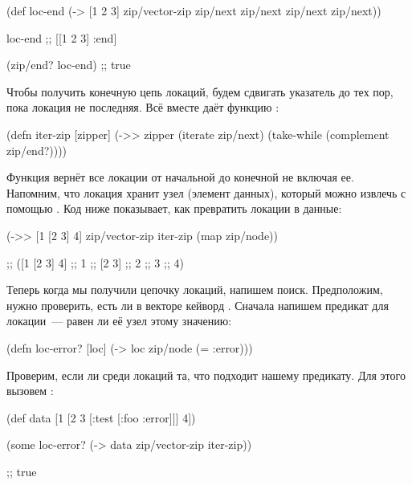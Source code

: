 \begin{english}
  \begin{clojure}
(def loc-end
  (-> [1 2 3]
      zip/vector-zip
      zip/next
      zip/next
      zip/next
      zip/next))

loc-end
;; [[1 2 3] :end]

(zip/end? loc-end)
;; true

  \end{clojure}
\end{english}

Чтобы получить конечную цепь локаций, будем сдвигать указатель до тех пор, пока
локация не последняя. Всё вместе даёт функцию :

\begin{english}
  \begin{clojure}
(defn iter-zip [zipper]
  (->> zipper
       (iterate zip/next)
       (take-while (complement zip/end?))))
  \end{clojure}
\end{english}

Функция вернёт все локации от начальной до конечной не включая ее. Напомним, что
локация хранит узел (элемент данных), который можно извлечь с помощью
. Код ниже показывает, как превратить локации в данные:

\begin{english}
  \begin{clojure}
(->> [1 [2 3] 4]
     zip/vector-zip
     iter-zip
     (map zip/node))

;; ([1 [2 3] 4]
;;  1
;;  [2 3]
;;  2
;;  3
;;  4)
  \end{clojure}
\end{english}

Теперь когда мы получили цепочку локаций, напишем поиск. Предположим, нужно
проверить, есть ли в векторе кейворд . Сначала напишем предикат для
локации~--- равен ли её узел этому значению:

\begin{english}
  \begin{clojure}
(defn loc-error? [loc]
  (-> loc zip/node (= :error)))
  \end{clojure}
\end{english}

Проверим, если ли среди локаций та, что подходит нашему предикату.  Для этого
вызовем :

\begin{english}
  \begin{clojure}
(def data [1 [2 3 [:test [:foo :error]]] 4])

(some loc-error?
      (-> data zip/vector-zip iter-zip))

;; true
  \end{clojure}
\end{english}

